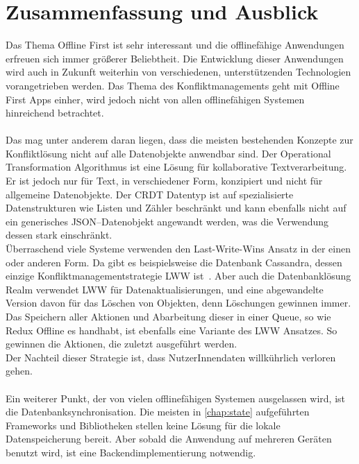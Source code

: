 \chapter{\label{chap:fazit}Zusammenfassung und Ausblick}
Das Thema Offline First ist sehr interessant und die offlinefähige Anwendungen erfreuen sich immer größerer Beliebtheit.
Die Entwicklung dieser Anwendungen wird auch in Zukunft weiterhin von verschiedenen, unterstützenden Technologien vorangetrieben werden.
Das Thema des Konfliktmanagements geht mit Offline First \glspl{App} einher, wird jedoch nicht von allen offlinefähigen Systemen hinreichend betrachtet.\\\\
Das mag unter anderem daran liegen, dass die meisten bestehenden Konzepte zur Konfliktlösung nicht auf alle Datenobjekte anwendbar sind.
Der Operational Transformation Algorithmus ist eine Lösung für kollaborative Textverarbeitung. Er ist jedoch nur für Text, in verschiedener Form, konzipiert und nicht für allgemeine Datenobjekte.
Der \gls{CRDT} Datentyp ist auf spezialisierte Datenstrukturen wie Listen und Zähler beschränkt und kann ebenfalls nicht auf ein generisches \gls{JSON}--Datenobjekt angewandt werden, was die Verwendung dessen stark einschränkt.\\
Überraschend viele Systeme verwenden den Last-Write-Wins Ansatz in der einen oder anderen Form.
Da gibt es beispielsweise die Datenbank Cassandra, dessen einzige Konfliktmanagementstrategie \gls{LWW} ist~\cite{cassandralww}.
Aber auch die Datenbanklösung Realm verwendet \gls{LWW} für Datenaktualisierungen, und eine abgewandelte Version davon für das Löschen von Objekten, denn Löschungen gewinnen immer.
Das Speichern aller Aktionen und Abarbeitung dieser in einer \gls{Queue}, so wie Redux Offline es handhabt, ist ebenfalls eine Variante des \gls{LWW} Ansatzes.
So gewinnen die Aktionen, die zuletzt ausgeführt werden.\\
Der Nachteil dieser Strategie ist, dass NutzerInnendaten willkührlich verloren gehen.\\\\
%
%
%
Ein weiterer Punkt, der von vielen offlinefähigen Systemen ausgelassen wird, ist die Datenbanksynchronisation.
Die meisten in \autoref{chap:state} aufgeführten Frameworks und Bibliotheken stellen keine Lösung für die lokale Datenspeicherung bereit. 
Aber sobald die Anwendung auf mehreren Geräten benutzt wird, ist eine Backendimplementierung notwendig.
